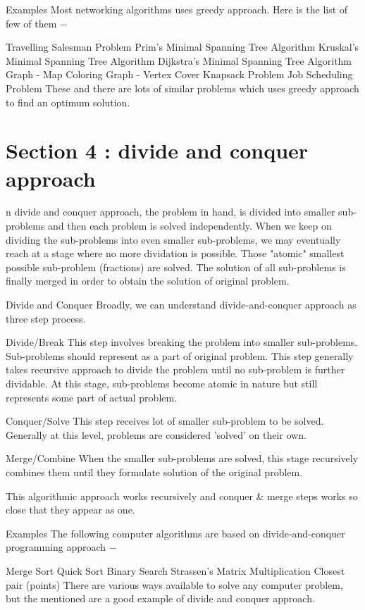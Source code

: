 \begin{frame}
Examples
Most networking algorithms uses greedy approach. Here is the list of few of them −

Travelling Salesman Problem
Prim's Minimal Spanning Tree Algorithm
Kruskal's Minimal Spanning Tree Algorithm
Dijkstra's Minimal Spanning Tree Algorithm
Graph - Map Coloring
Graph - Vertex Cover
Knapsack Problem
Job Scheduling Problem
These and there are lots of similar problems which uses greedy approach to find an optimum solution.

\end{frame}
\section{Section 4 : divide and conquer approach}
\begin{frame}
n divide and conquer approach, the problem in hand, is divided into smaller sub-problems and then each problem is solved independently. When we keep on dividing the sub-problems into even smaller sub-problems, we may eventually reach at a stage where no more dividation is possible. Those "atomic" smallest possible sub-problem (fractions) are solved. The solution of all sub-problems is finally merged in order to obtain the solution of original problem.

Divide and Conquer
Broadly, we can understand divide-and-conquer approach as three step process.

Divide/Break
This step involves breaking the problem into smaller sub-problems. Sub-problems should represent as a part of original problem. This step generally takes recursive approach to divide the problem until no sub-problem is further dividable. At this stage, sub-problems become atomic in nature but still represents some part of actual problem.

Conquer/Solve
This step receives lot of smaller sub-problem to be solved. Generally at this level, problems are considered 'solved' on their own.

Merge/Combine
When the smaller sub-problems are solved, this stage recursively combines them until they formulate solution of the original problem.

This algorithmic approach works recursively and conquer & merge steps works so close that they appear as one.

Examples
The following computer algorithms are based on divide-and-conquer programming approach −

Merge Sort
Quick Sort
Binary Search
Strassen's Matrix Multiplication
Closest pair (points)
There are various ways available to solve any computer problem, but the mentioned are a good example of divide and conquer approach.

\end{frame}
